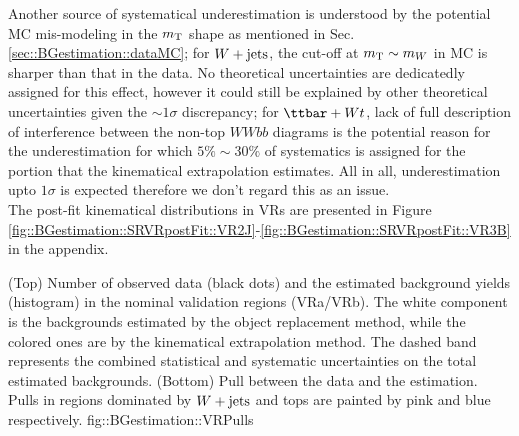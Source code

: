 Another source of systematical underestimation is understood by the potential MC mis-modeling in the $m_{\mathrm{T}}$ shape as mentioned in Sec. \ref{sec::BGestimation::dataMC}; for $W+\mathrm{jets}$, 
the cut-off at $m_{\mathrm{T}}\sim m_W$ in MC is sharper than that in the data.
No theoretical uncertainties are dedicatedly assigned for this effect, however it could still be explained by other theoretical uncertainties given the $\sim 1 \sigma$ discrepancy; 
for $\ttbar+Wt$, lack of full description of interference between the non-top $WWbb$ diagrams is the potential reason for the underestimation for which $5\% \sim 30\%$ of systematics is assigned for the portion that the kinematical extrapolation estimates. 
All in all, underestimation upto $1\sigma$ is expected therefore we don't regard this as an issue.  \\

The post-fit kinematical distributions in VRs are presented in Figure \ref{fig::BGestimation::SRVRpostFit::VR2J}-\ref{fig::BGestimation::SRVRpostFit::VR3B} in the appendix.

\clearpage


{(Top) Number of observed data (black dots) and the estimated background yields (histogram) in the nominal validation regions (VRa/VRb). 
The white component is the backgrounds estimated by the object replacement method, while the colored ones are by the kinematical extrapolation method. 
The dashed band represents the combined statistical and systematic uncertainties on the total estimated backgrounds. (Bottom) Pull between the data and the estimation. Pulls in regions dominated by $W+\mathrm{jets}$ and tops are painted by pink and blue respectively.}
{fig::BGestimation::VRPulls}

\clearpage
%



